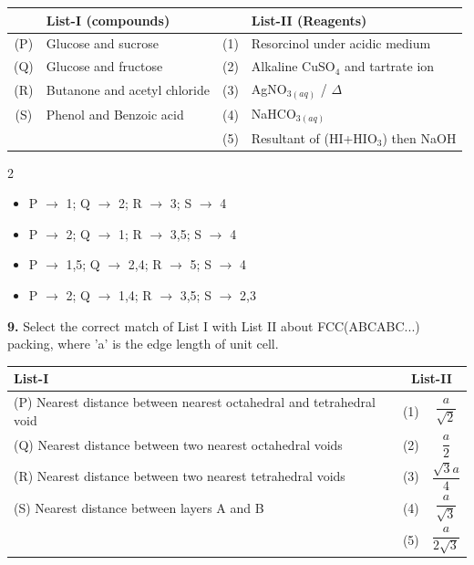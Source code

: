 \documentclass[10pt]{extarticle}
\newenvironment{qoptions}{\begin{itemize}[leftmargin=1.8em,itemsep=2pt,topsep=2pt,label={}]}{\end{itemize}}
\newcommand{\opt}[2]{\item[({#1})] {#2}}
\begin{document}
\begin{center}
\begin{tabular}{|c|l|c|l|}
\hline
& \textbf{List-I (compounds)} & & \textbf{List-II (Reagents)} \\
\hline
(P) & Glucose and sucrose & (1) & Resorcinol under acidic medium \\
\hline
(Q) & Glucose and fructose & (2) & Alkaline CuSO$_4$ and tartrate ion \\
\hline
(R) & Butanone and acetyl chloride & (3) & AgNO$_{3(aq)}$ / $\Delta$ \\
\hline
(S) & Phenol and Benzoic acid & (4) & NaHCO$_{3(aq)}$ \\
\hline
 & & (5) & Resultant of (HI+HIO$_3$) then NaOH \\
\hline
\end{tabular}
\end{center}

\begin{multicols}{2}
\begin{qoptions}
\opt{A}{P $\to$ 1; Q $\to$ 2; R $\to$ 3; S $\to$ 4}
\opt{B}{P $\to$ 2; Q $\to$ 1; R $\to$ 3,5; S $\to$ 4}
\opt{C}{P $\to$ 1,5; Q $\to$ 2,4; R $\to$ 5; S $\to$ 4}
\opt{D}{P $\to$ 2; Q $\to$ 1,4; R $\to$ 3,5; S $\to$ 2,3}
\end{qoptions}

\textbf{9.} Select the correct match of List I with List II about FCC(ABCABC...) packing, where 'a' is the edge length of unit cell.

\end{multicols}

\begin{center}
\begin{tabular}{|l|c|c|}
\hline
\textbf{List-I} & \multicolumn{2}{c|}{\textbf{List-II}} \\
\hline
(P) Nearest distance between nearest octahedral and tetrahedral void & (1) & $\dfrac a{\sqrt2}$ \\[6pt]
\hline
(Q) Nearest distance between two nearest octahedral voids & (2) & $\dfrac a2$ \\[6pt]
\hline
(R) Nearest distance between two nearest tetrahedral voids & (3) & $\dfrac{\sqrt3a}4$ \\[6pt]
\hline
(S) Nearest distance between layers A and B & (4) & $\dfrac a{\sqrt3}$ \\[6pt]
\hline
 & (5) & $\dfrac a{2\sqrt3}$ \\[6pt]
\hline
\end{tabular}
\end{center}
\end{document}
